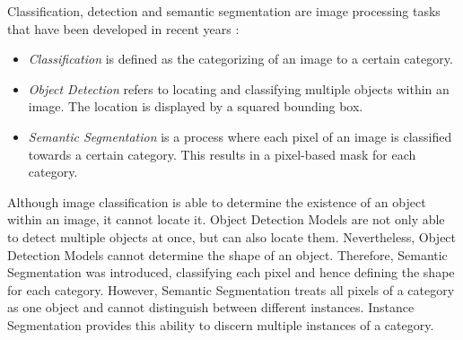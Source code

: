 Classification, detection and semantic segmentation are image processing tasks  that have been developed in recent years \cite{He.op.2017}\cite{Sharma.21.08.2019}\cite{.08.05.2022}:


\begin{itemize}
    \item \textit{Classification}  is defined as the categorizing of an image to a certain category.
    
    \item \textit{Object Detection} refers to locating and classifying multiple objects within an image. The location is displayed by a squared bounding box.
    
    \item \textit{Semantic Segmentation} is a process where each pixel of an image is classified towards a certain category. This results in a pixel-based mask for each category.
    
\end{itemize}

Although image classification is able to determine the existence of an object within an image, it cannot locate it. Object Detection Models are not only able to detect multiple objects at once, but can also locate them. Nevertheless, Object Detection Models cannot determine the shape of an object. Therefore, Semantic Segmentation was introduced, classifying each pixel and hence defining the shape for each category. However, Semantic Segmentation treats all pixels of a category as one object and cannot distinguish between different instances. Instance Segmentation provides this ability to discern multiple instances of a category.